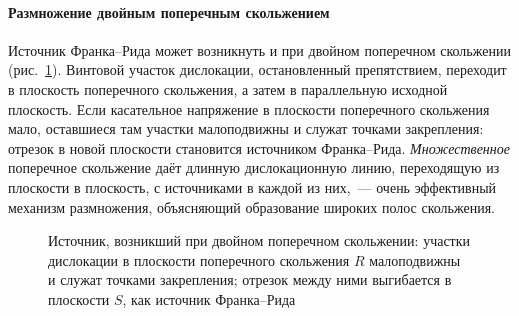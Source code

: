 \paragraph{Размножение двойным поперечным скольжением}
Источник Франка--Рида может возникнуть и при двойном поперечном
скольжении (рис.~\ref{fig:double-cross}). Винтовой участок дислокации,
остановленный препятствием, переходит в плоскость поперечного скольжения,
а затем в параллельную исходной плоскость. Если касательное напряжение в
плоскости поперечного скольжения мало, оставшиеся там участки
малоподвижны и служат точками закрепления: отрезок в новой плоскости
становится источником Франка--Рида. \emph{Множественное} поперечное
скольжение даёт длинную дислокационную линию, переходящую из плоскости в
плоскость, с источниками в каждой из них,~— очень эффективный механизм
размножения, объясняющий образование широких полос скольжения.

\begin{figure}[ht]
\centering
{}
\caption{Источник, возникший при двойном поперечном скольжении: участки
дислокации в плоскости поперечного скольжения $R$ малоподвижны и служат
точками закрепления; отрезок между ними выгибается в плоскости $S$, как
источник Франка--Рида}
\label{fig:double-cross}
\end{figure}

